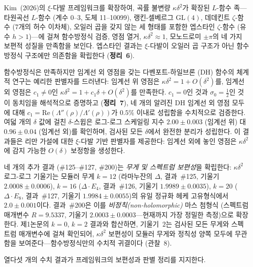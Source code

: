 \documentclass[11pt, a4paper]{article}
\theoremstyle{plain}
\theoremstyle{definition}
\begin{document}
\begin{tcolorbox}[
  colback=lightbg, colframe=zetaviolet!60!black,
  title={\bfseries 초록}, fonttitle=\large,
  arc=3pt, boxrule=0.8pt, toptitle=3pt, bottomtitle=3pt
]
Kim~(2026)의 $\xi$-다발 프레임워크를 확장하여,
곡률 불변량 $\kappa\delta^{2}$가 확장된 $L$-함수 족---
타원곡선 $L$-함수 (계수 0--3, 도체 11--10099),
랭킨-셀베르그 $\mathrm{GL}(4)$, 데데킨트
$\zeta$-함수 (7개의 허수 이차체), 오일러 곱을 갖지 않는
세 형태를 포함한 엡스타인 $\zeta$-함수 (유수 $h>1$)---에 걸쳐
함수방정식 검증, 영점 열거, $\kappa\delta^{2}\approx 1$,
모노드로미 $\pm\pi$의 네 가지 보편적 성질을 만족함을 보인다.
엡스타인 결과는 $\xi$-다발이 오일러 곱 구조가 아닌
함수방정식 구조에만 의존함을 확립한다
(\textbf{정리~6}).

함수방정식은 만족하지만 임계선 외 영점을 갖는
다벤포트-하일브론 (DH) 함수의 체계적 연구는
예리한 판별자를 드러낸다: 임계선 위 영점은
$\kappa\delta^{2} = 1 + O(\delta^{2})$를,
임계선 외 영점은 $c_{1}\neq 0$인
$\kappa\delta^{2} = 1 + c_{1}\delta + O(\delta^{2})$를 만족한다.
$c_{1} = 0$인 것과 $\sigma_{0}=\tfrac{1}{2}$인 것이
동치임을 해석적으로 증명하고 (\textbf{정리~7}),
네 개의 알려진 DH 임계선 외 영점 모두에 대해
$c_{1} = \mathrm{Re}(\Lambda''(\rho)/\Lambda'(\rho))$가
$0.5\%$ 이내로 성립함을 수치적으로 검증한다.
여덟 개의 $\delta$ 값에 걸친 $\delta$-스윕은
로그-로그 스케일링 지수 $2.00\pm0.003$ (임계선 위)
대 $0.96\pm0.04$ (임계선 외)를 확인하며,
검사된 모든 $\delta$에서 완전한 분리가 성립한다.
이 결과들은 리만 가설에 대한 $\xi$-다발 기반 판별자를 제공한다:
임계선 외에 놓인 영점은 $\kappa\delta^{2}$에
감지 가능한 $O(\delta)$ 보정항을 생성한다.

\smallskip
\noindent 네 개의 추가 결과 (\#125--\#127, \#200)는 \emph{무게 및 스펙트럼 보편성}을 확립한다:
$\kappa\delta^{2}$ 로그-로그 기울기는 모듈러 무게 $k=12$
(라마누잔의 $\Delta$, 결과~\#125, 기울기 $2.0008\pm 0.0006$),
$k=16$ ($\Delta\cdot E_4$, 결과~\#126, 기울기 $1.9989\pm 0.0035$),
$k=20$ ($\Delta\cdot E_8$, 결과~\#127, 기울기 $1.9984\pm 0.0055$)의
유일 정규화 헤케 고유형식에서 $2.0\pm 0.001$이다.
결과~\#200은 이를 \emph{비정칙(non-holomorphic)} 마스 첨형식
(스펙트럼 매개변수 $R=9.5337$, 기울기 $2.0003\pm 0.0003$---현재까지
가장 정밀한 측정)으로 확장한다.
제1논문의 $k=0$, $k=2$ 결과와 합산하면,
기울기~$2$는 검사된 모든 무게와 스펙트럼 매개변수에 걸쳐 확인되어,
$\kappa\delta^{2}$ 보편성이 모듈러 무게와 정칙성 양쪽 모두에
무관함을 보여준다---함수방정식만의 수치적 귀결이다 (관찰~8).

\smallskip
\noindent 열다섯 개의 수치 결과가 프레임워크의 보편성과
판별 정리를 지지한다.
\end{tcolorbox}
\end{document}
